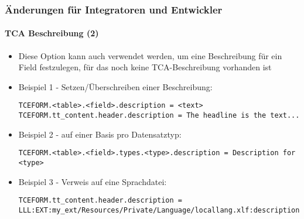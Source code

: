 \begin{frame}[fragile]
	\frametitle{Änderungen für Integratoren und Entwickler}
	\framesubtitle{TCA Beschreibung (2)}


	\begin{itemize}
		\item Diese Option kann auch verwendet werden, um eine Beschreibung für ein Field festzulegen,
			für das noch keine TCA-Beschreibung vorhanden ist
	\end{itemize}

	\begin{itemize}
		\item Beispiel 1 - Setzen/Überschreiben einer Beschreibung:
\begin{lstlisting}
TCEFORM.<table>.<field>.description = <text>
TCEFORM.tt_content.header.description = The headline is the text...
\end{lstlisting}
		\item Beispiel 2 - auf einer Basis pro Datensatztyp:
\begin{lstlisting}
TCEFORM.<table>.<field>.types.<type>.description = Description for <type>
\end{lstlisting}
		\item Beispiel 3 - Verweis auf eine Sprachdatei:
\begin{lstlisting}
TCEFORM.tt_content.header.description = LLL:EXT:my_ext/Resources/Private/Language/locallang.xlf:description
\end{lstlisting}

	\end{itemize}

\end{frame}

